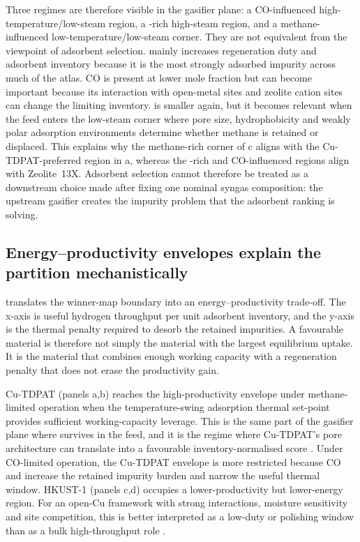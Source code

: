 \documentclass[11pt,a4paper]{article}
\newcommand{\COtwo}{\ce{CO2}}
\newcommand{\CHfour}{\ce{CH4}}
\newcommand{\TSA}{temperature-swing adsorption}
\begin{document}
Three regimes are therefore visible in the gasifier plane: a CO-influenced
high-temperature/low-steam region, a \COtwo-rich high-steam region, and a
methane-influenced low-temperature/low-steam corner. They are not equivalent
from the viewpoint of adsorbent selection. \COtwo{} mainly increases
regeneration duty and adsorbent inventory because it is the most strongly
adsorbed impurity across much of the atlas. CO is present at lower mole
fraction but can become important because its interaction with open-metal sites
and zeolite cation sites can change the limiting inventory. \CHfour{} is smaller
again, but it becomes relevant when the feed enters the low-steam corner where
pore size, hydrophobicity and weakly polar adsorption environments determine
whether methane is retained or displaced. This explains why the methane-rich
corner of c aligns with the Cu-TDPAT-preferred region in
a, whereas the \COtwo-rich and CO-influenced regions align with
Zeolite~13X. Adsorbent selection cannot therefore be treated as a downstream
choice made after fixing one nominal syngas composition: the upstream gasifier
creates the impurity problem that the adsorbent ranking is solving.

\subsection{Energy--productivity envelopes explain the partition mechanistically}
\label{sec:tradeoff}

 translates the winner-map boundary into an
energy--productivity trade-off. The x-axis is useful hydrogen throughput per
unit adsorbent inventory, and the y-axis is the thermal penalty required to
desorb the retained impurities. A favourable material is therefore not simply
the material with the largest equilibrium uptake. It is the material that
combines enough working capacity with a regeneration penalty that does not erase
the productivity gain.

Cu-TDPAT (panels a,b) reaches the high-productivity envelope under
methane-limited operation when the \TSA{} thermal set-point provides sufficient
working-capacity leverage. This is the same part of the gasifier plane where
\CHfour{} survives in the feed, and it is the regime where Cu-TDPAT's pore
architecture can translate into a favourable inventory-normalised score
\citep{Wu2012CuTDPAT,Liu2014CuTDPAT,Asgari2021CuTDPAT}. Under CO-limited
operation, the Cu-TDPAT envelope is more restricted because CO and \COtwo{}
increase the retained impurity burden and narrow the useful thermal window.
HKUST-1 (panels c,d) occupies a lower-productivity but lower-energy region. For
an open-Cu framework with strong \COtwo{} interactions, moisture sensitivity and
site competition, this is better interpreted as a low-duty or polishing window
than as a bulk high-throughput role
\citep{Abid2023HKUST,Yin2018HKUSTCO,Zelenka2022HKUSTAmine,Rostom2024CuBTC}.
\end{document}
